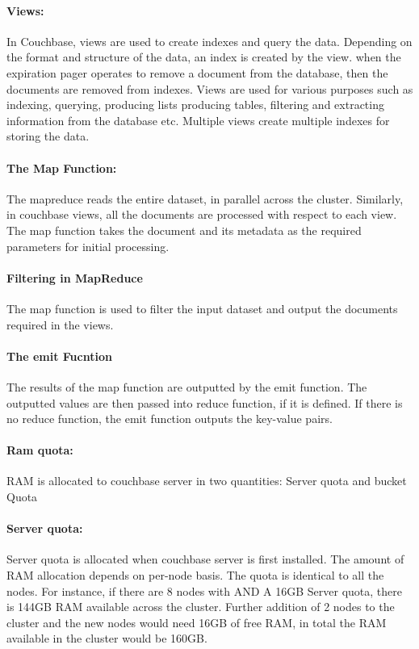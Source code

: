 

 \paragraph{Views:}
      In Couchbase, views are used to create indexes and query the data. Depending on the format and structure of the data, an index is created by the view. when the expiration pager operates to remove a document from the database, then the documents are removed from indexes. Views are used for various purposes such as indexing, querying, producing lists producing tables, filtering and extracting information from the database etc. Multiple views create multiple indexes for storing the data.
      
  \paragraph{The Map Function:}
       The mapreduce reads the entire dataset, in parallel across the cluster. Similarly, in couchbase views, all the documents are processed with respect to each view. The map function takes the document and its metadata as the required parameters for initial processing. 
 
 
 
 \paragraph{Filtering in MapReduce}
        The map function is used to filter the input dataset and output the documents required in the views.
        
        
        \paragraph{The emit Fucntion}
        The results of the map function are outputted by the emit function. The outputted values are then passed into reduce function, if it is defined. If there is no reduce function, the emit function outputs the key-value pairs.
 
 
   \paragraph{Ram quota:}
       RAM is allocated to couchbase server in two quantities: Server quota and bucket Quota
       
       \paragraph{Server quota:}
          Server quota is allocated when couchbase server is first installed. The amount of RAM allocation depends on per-node basis. The quota is identical to all the nodes. For instance, if there are 8 nodes with AND A 16GB Server quota, there is 144GB RAM available across the cluster. Further addition of 2 nodes to the cluster and the new nodes would need 16GB of free RAM, in total the RAM available in the cluster would be 160GB.   
